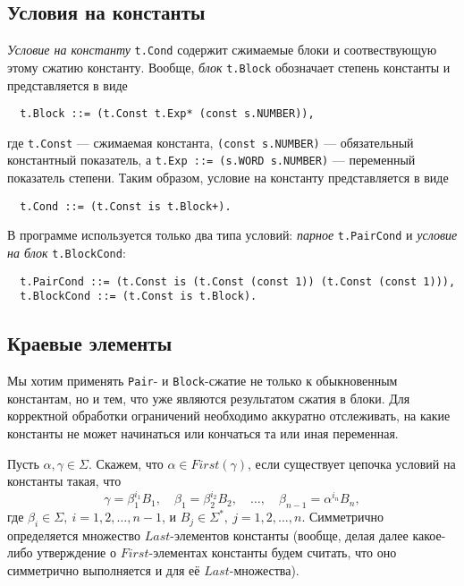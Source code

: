 \documentclass[12pt]{article}
\begin{document}
\subsection{Условия на константы}

\textit{Условие на константу} \texttt{t.Cond} содержит сжимаемые блоки и
соотвествующую этому сжатию константу. Вообще, \textit{блок} \texttt{t.Block}
обозначает степень константы и представляется в виде
\begin{Verbatim}
  t.Block ::= (t.Const t.Exp* (const s.NUMBER)),
\end{Verbatim}
где \texttt{t.Const} --- сжимаемая константа, \texttt{(const s.NUMBER)} ---
обязательный константный показатель, а \texttt{t.Exp ::= (s.WORD s.NUMBER)}
--- переменный показатель степени. Таким образом, условие на константу
представляется в виде
\begin{Verbatim}
  t.Cond ::= (t.Const is t.Block+).
\end{Verbatim}
В программе используется только два типа условий: \textit{парное}
\texttt{t.PairCond} и \textit{условие на блок} \texttt{t.BlockCond}:
\begin{Verbatim}
  t.PairCond ::= (t.Const is (t.Const (const 1)) (t.Const (const 1))),
  t.BlockCond ::= (t.Const is t.Block).
\end{Verbatim}


\subsection{Краевые элементы} \label{base-bound}

Мы хотим применять \texttt{Pair}- и \texttt{Block}-сжатие не только к
обыкновенным константам, но и тем, что уже являются результатом сжатия в блоки.
Для корректной обработки ограничений необходимо аккуратно отслеживать, на какие
константы не может начинаться или кончаться та или иная переменная.

Пусть $\alpha, \gamma \in \Sigma$. Скажем, что $\alpha \in First(\gamma)$, если
существует цепочка условий на константы такая, что
\begin{displaymath}
  \gamma = \beta_1^{i_1} B_1, \quad \beta_1 = \beta_2^{i_2} B_2, \quad
  \dots, \quad \beta_{n-1} = \alpha^{i_n} B_n,
\end{displaymath}
где $\beta_i \in \Sigma, \ i = 1, 2, \dots, n - 1$, и $B_j \in \Sigma^*,
\ j = 1, 2, \dots, n$. Симметрично определяется множество $Last$-элементов
константы (вообще, делая далее какое-либо утверждение о $First$-элементах
константы будем считать, что оно симметрично выполняется и для её
$Last$-множества).
\end{document}
